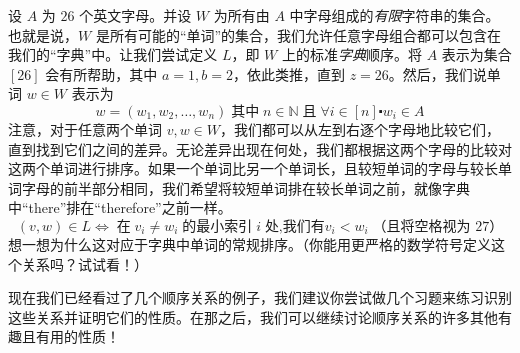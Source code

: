 \begin{example}
    设 $A$ 为 $26$ 个英文字母。并设 $W$ 为所有由 $A$ 中字母组成的\emph{有限}字符串的集合。也就是说，$W$ 是所有可能的``单词''的集合，我们允许任意字母组合都可以包含在我们的``字典''中。让我们尝试定义 $L$，即 $W$ 上的标准\emph{字典}顺序。将 $A$ 表示为集合 $[26]$ 会有所帮助，其中 $a = 1, b = 2$，依此类推，直到 $z = 26$。然后，我们说单词 $w \in W$ 表示为
    \[w = (w_1, w_2, \dots , w_n) \;\text{其中}\; n \in \mathbb{N} \;\text{且}\; \forall i \in [n] \centerdot w_i \in A\]
    注意，对于任意两个单词 $v, w \in W$，我们都可以从左到右逐个字母地比较它们，直到找到它们之间的差异。无论差异出现在何处，我们都根据这两个字母的比较对这两个单词进行排序。如果一个单词比另一个单词长，且较短单词的字母与较长单词字母的前半部分相同，我们希望将较短单词排在较长单词之前，就像字典中``there''排在``therefore''之前一样。
    \[(v, w) \in L \iff \;\text{在}\; v_i \ne w_i \;\text{的最小索引}\; i \;\text{处,我们有} v_i < w_i \;\text{（且将空格视为 27）}\]
    想一想为什么这对应于字典中单词的常规排序。（你能用更严格的数学符号定义这个关系吗？试试看！）
\end{example}

现在我们已经看过了几个顺序关系的例子，我们建议你尝试做几个习题来练习识别这些关系并证明它们的性质。在那之后，我们可以继续讨论顺序关系的许多其他有趣且有用的性质！

